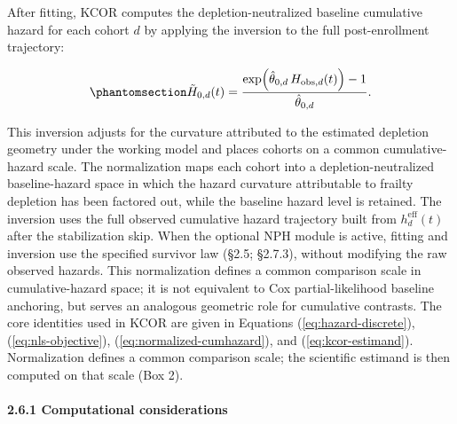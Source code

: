 \documentclass[
]{article}
\begin{document}
After fitting, KCOR computes the depletion-neutralized baseline cumulative hazard for each cohort \(d\) by applying the inversion to the full post-enrollment trajectory:

\begin{equation}\protect\phantomsection\label{eq:normalized-cumhazard}{\tilde H_{0,d}(t) = \frac{\exp\!\left(\hat{\theta}_{0,d}\,H_{\mathrm{obs},d}(t)\right)-1}{\hat{\theta}_{0,d}}.}\end{equation}

This inversion adjusts for the curvature attributed to the estimated depletion geometry under the working model and places cohorts on a common cumulative-hazard scale. The normalization maps each cohort into a depletion-neutralized baseline-hazard space in which the hazard curvature attributable to frailty depletion has been factored out, while the baseline hazard level is retained. The inversion uses the full observed cumulative hazard trajectory built from \(h_d^{\mathrm{eff}}(t)\) after the stabilization skip. When the optional NPH module is active, fitting and inversion use the specified survivor law (§2.5; §2.7.3), without modifying the raw observed hazards. This normalization defines a common comparison scale in cumulative-hazard space; it is not equivalent to Cox partial-likelihood baseline anchoring, but serves an analogous geometric role for cumulative contrasts. The core identities used in KCOR are given in Equations (\ref{eq:hazard-discrete}), (\ref{eq:nls-objective}), (\ref{eq:normalized-cumhazard}), and (\ref{eq:kcor-estimand}). Normalization defines a common comparison scale; the scientific estimand is then computed on that scale (Box 2).

\paragraph{2.6.1 Computational considerations}\label{computational-considerations}
\end{document}
